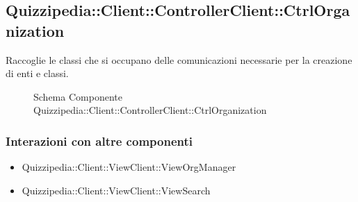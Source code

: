 \subsection{Quizzipedia::Client::ControllerClient::CtrlOrganization}
Raccoglie le classi che si occupano delle comunicazioni necessarie per la creazione di enti e classi.
\begin{figure}[H]
\centering
\noindent{}
\caption[Schema Componente Quizzipedia::Client::ControllerClient::CtrlOrganization]{Schema Componente Quizzipedia::Client::ControllerClient::CtrlOrganization}
\end{figure}
\subsubsection{Interazioni con altre componenti}
\begin{itemize}
\item Quizzipedia::Client::ViewClient::ViewOrgManager
\item Quizzipedia::Client::ViewClient::ViewSearch
\end{itemize}
